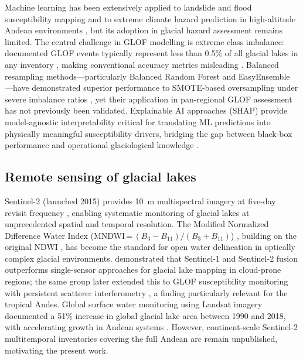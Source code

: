 \documentclass[pdflatex,sn-basic]{sn-jnl}%
\begin{document}
Machine learning has been extensively applied to landslide and flood
susceptibility mapping \citep{Merghadi2020,Pourghasemi2020} and to
extreme climate hazard prediction in high-altitude Andean environments
\citep{Torres-Cruz2025}, but its adoption in glacial hazard assessment
remains limited. The central
challenge in GLOF modelling is extreme class imbalance: documented GLOF
events typically represent less than 0.5\% of all glacial lakes in any
inventory \citep{Rounce2024,Lutzow2023}, making conventional accuracy
metrics misleading \citep{Lobo2008,Chicco2020,He2009}. Balanced
resampling methods---particularly Balanced Random Forest \citep{Chen2004}
and EasyEnsemble \citep{Liu2009}---have demonstrated superior
performance to SMOTE-based oversampling under severe imbalance ratios
\citep{Lemaitre2017}, yet their application in pan-regional GLOF
assessment has not previously been validated. Explainable AI approaches
(SHAP) \citep{LundbergLee2017,Lundberg2020} provide model-agnostic
interpretability critical for translating ML predictions into
physically meaningful susceptibility drivers, bridging the gap between
black-box performance and operational glaciological knowledge
\citep{Merghadi2020,Ghorbanzadeh2019}.

\subsection{Remote sensing of glacial lakes}

Sentinel-2 (launched 2015) provides 10~m multispectral imagery at
five-day revisit frequency \citep{Sentinel2MSI}, enabling systematic
monitoring of glacial lakes at unprecedented spatial and temporal
resolution. The Modified Normalized Difference Water Index
(MNDWI\,=\,$(B_3-B_{11})/(B_3+B_{11})$) \citep{Xu2006}, building on
the original NDWI \citep{McFeeters1996}, has become the standard for
open water delineation in optically complex glacial environments.
\citet{Wangchuk2020} demonstrated that Sentinel-1
and Sentinel-2 fusion outperforms single-sensor approaches for glacial
lake mapping in cloud-prone regions; the same group later extended this
to GLOF susceptibility monitoring with persistent scatterer
interferometry \citep{Wangchuk2022}, a finding particularly relevant
for the tropical Andes. Global surface water monitoring using Landsat imagery
\citep{Pekel2016,Shugar2020,Wang2020} documented a 51\% increase in global
glacial lake area between 1990 and 2018, with accelerating growth in
Andean systems \citep{Drenkhan2019,Colonia2017}. However,
continent-scale Sentinel-2 multitemporal inventories covering the full
Andean arc remain unpublished, motivating the present work.
\end{document}
